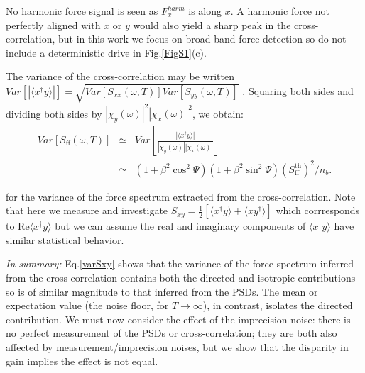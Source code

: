 \documentclass[twocolumn,english,notitlepage,superscriptaddress,nofootinbib]{revtex4-2}
\begin{document}
 No harmonic force signal is seen as $F_x^{harm}$ is along $x$.   A harmonic force not perfectly aligned with $x$ or $y$ would  also yield a sharp peak in the cross-correlation,  but in this work we focus on broad-band force detection so do not include a 
deterministic drive in  Fig.\ref{FigS1}(c).

 The variance of the cross-correlation may be written  $Var[|\langle x^\dagger y\rangle|]=\sqrt{Var[S_{xx}(\omega,T)]Var[S_{yy}(\omega,T)]}$   \cite{Bendat}.   Squaring both sides and dividing both sides  by $ |\chi_y(\omega)|^2 |\chi_x(\omega)|^2$, we obtain:
  \begin{eqnarray}
Var[ S_{\text{ff}} (\omega,T)] & \simeq &  Var[\frac{|\langle x^\dagger y\rangle|}{|\chi_y(\omega)| |\chi_x(\omega)|}]\nonumber \\
 &\simeq& {(1+\beta^2\cos^2 \Psi)  (1+\beta^2\sin^2 \Psi)}(S^{\text{th}}_{\text{ff}})^2/n_b.
\label{varSxy}
 \end{eqnarray}
 
for the variance of the force spectrum extracted from the cross-correlation.
Note that here we measure and investigate $S_{xy}= \frac{1}{2}[  \langle x^\dagger y\rangle + \langle x y^\dagger\rangle]$  
which corrresponds to $\text{Re}\langle x^\dagger y\rangle $ but we can assume
 the  real and imaginary components of $\langle x^\dagger y\rangle$ have similar statistical behavior.  


 
 
{\em  In summary:} Eq.\ref{varSxy}  shows that the variance of the force spectrum inferred from the cross-correlation contains both the directed and isotropic contributions so  is of similar magnitude to that
 inferred from the PSDs.  The mean or expectation value (the noise floor, for $T\to \infty$), in contrast,  isolates the directed contribution.
 We must now consider the effect of the imprecision noise: there is no perfect measurement of
 the PSDs or cross-correlation; they are both also affected by measurement/imprecision noises,
 but we show that the disparity in gain implies the effect is not equal.
\end{document}
